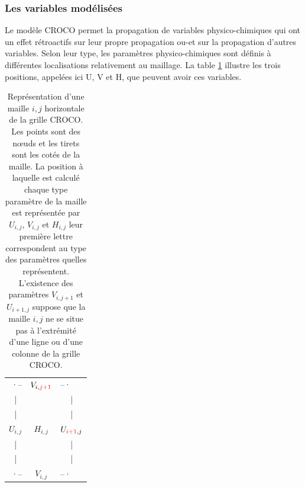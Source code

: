 \documentclass[10pt,a4paper,titlepage]{article}
\begin{document}


\subsubsection{Les variables modélisées}
Le modèle CROCO permet la propagation de variables physico-chimiques qui ont un effet rétroactifs sur leur propre propagation ou-et sur la propagation d'autres variables.
Selon leur type, les paramètres physico-chimiques sont définis à différentes localisations relativement au maillage.
La table \ref{structure_maille horizontale} %
illustre les trois positions, appelées ici U, V et H, que peuvent avoir ces variables.

\begin{table}
    \centering
    \begin{tabular}{ c c c }
        \multicolumn{1}{r}{·--} & $V_{i,{\color{red}j+1}}$ & \multicolumn{1}{l}{--·} \\ 
        | & & | \\
        | & & | \\
        $U_{i,j}$ & $H_{i,j}$ & $U_{{\color{red}i+1},j}$ \\  
        | & & | \\
        | & & | \\
        \multicolumn{1}{r}{·--} & \textbf{$V_{i,j}$} & \multicolumn{1}{l}{--·}
    \end{tabular}
    \caption{Représentation d'une maille $i,j$ horizontale de la grille CROCO.
        Les points sont des nœuds et les tirets sont les cotés de la maille.
        La position à laquelle est calculé chaque type paramètre de la maille est représentée par $U_{i,j}$, $V_{i,j}$ et $H_{i,j}$ leur première lettre correspondent au type des paramètres quelles représentent.
        L'existence des paramètres $V_{i,j+1}$ et $U_{i+1,j}$ suppose que la maille $i,j$ ne se situe pas à l'extrémité d'une ligne ou d'une colonne de la grille CROCO.
        }
    \label{structure_maille horizontale}
\end{table}
\end{document}
